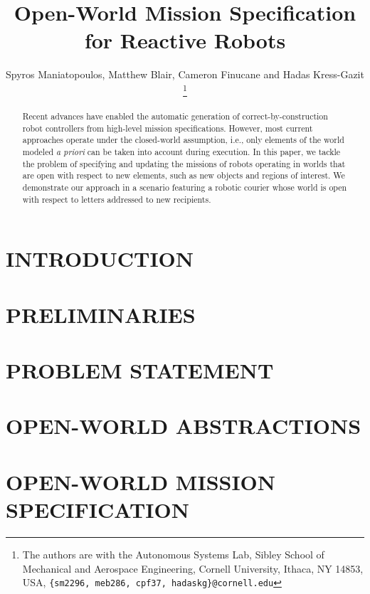 \documentclass[letterpaper, 10 pt, conference]{ieeeconf}  %
\title{\LARGE \bf
	Open-World Mission Specification for Reactive Robots
}
\author{Spyros Maniatopoulos, Matthew Blair, Cameron Finucane and Hadas Kress-Gazit%
\thanks{The authors are with the Autonomous Systems Lab, Sibley School of Mechanical and Aerospace Engineering, Cornell University, Ithaca, NY 14853, USA, {\tt \{sm2296, meb286, cpf37, hadaskg\}\nolinkurl{@cornell.edu}}}%
}
\begin{document}
%
\maketitle
\thispagestyle{empty}
\pagestyle{empty}
%
\begin{abstract}

Recent advances have enabled the automatic generation of correct-by-construction robot controllers from high-level mission specifications. 
However, most current approaches operate under the closed-world assumption, i.e., only elements of the world modeled \emph{a priori} can be taken into account during execution. 
In this paper, we tackle the problem of specifying and updating the missions of robots operating in worlds that are open with respect to new elements, such as new objects and regions of interest.
We demonstrate our approach in a scenario featuring a robotic courier whose world is open with respect to letters addressed to new recipients.

\end{abstract}
%
%
\section{INTRODUCTION}

%
\section{PRELIMINARIES}\label{preliminaries}

%
\section{PROBLEM STATEMENT}\label{problem}

%
\section{OPEN-WORLD ABSTRACTIONS}\label{abstractions}

%
\section{OPEN-WORLD MISSION SPECIFICATION}\label{openworld}

%
\end{document}
